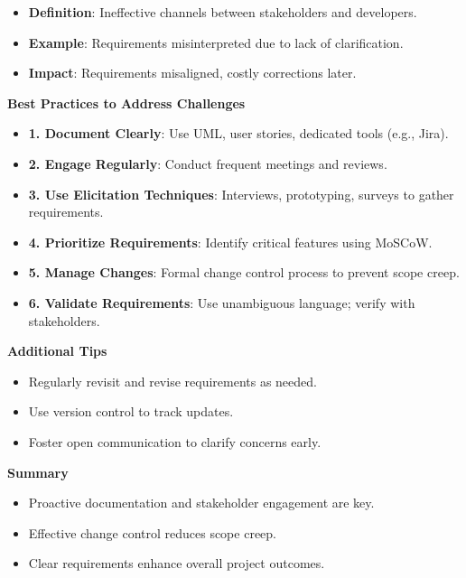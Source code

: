 \documentclass{beamer}
\begin{document}
\begin{frame}[fragile]
    \begin{itemize}
        \frametitle{Challenge: Stakeholder Communication Gaps}
        \item \textbf{Definition}: Ineffective channels between stakeholders and developers.
        \item \textbf{Example}: Requirements misinterpreted due to lack of clarification.
        \item \textbf{Impact}: Requirements misaligned, costly corrections later.
    \end{itemize}
\end{frame}

\begin{frame}[fragile]
    \textbf{Best Practices to Address Challenges}
\begin{itemize}
    \item \textbf{1. Document Clearly}: Use UML, user stories, dedicated tools (e.g., Jira).
    \item \textbf{2. Engage Regularly}: Conduct frequent meetings and reviews.
    \item \textbf{3. Use Elicitation Techniques}: Interviews, prototyping, surveys to gather requirements.
    \item \textbf{4. Prioritize Requirements}: Identify critical features using MoSCoW.
    \item \textbf{5. Manage Changes}: Formal change control process to prevent scope creep.
    \item \textbf{6. Validate Requirements}: Use unambiguous language; verify with stakeholders.
\end{itemize}
\end{frame}

\begin{frame}[fragile]
    \textbf{Additional Tips}
    \begin{itemize}
        \item Regularly revisit and revise requirements as needed.
        \item Use version control to track updates.
        \item Foster open communication to clarify concerns early.
    \end{itemize}
\end{frame}

\begin{frame}[fragile]
    \textbf{Summary}
    \begin{itemize}
        \item Proactive documentation and stakeholder engagement are key.
        \item Effective change control reduces scope creep.
        \item Clear requirements enhance overall project outcomes.
    \end{itemize}
\end{frame}
\end{document}
